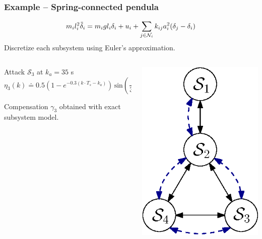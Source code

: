 \documentclass[presentation]{beamer}
\newcommand{\NN}{{\mathcal{N}}}
\begin{document}
\begin{frame}
	\frametitle{Example -- Spring-connected pendula}
	\begin{equation*}
		m_il_i^2\Ddot{\delta}_i = m_igl_i\delta_i + u_i + \sum_{j\in\NN_i} k_{ij}a_i^2(\delta_j-\delta_i)
	\end{equation*}
	\centering
	Discretize each subsystem using Euler's approximation.
	
	\vfill
	\begin{columns}
		\begin{column}{0.75\linewidth}
			Attack $\mathcal S_3 $ at $k_a = 35$ s
			$$\eta_3(k) \doteq 0.5 \left(1-e^{-0.3 (k\cdot T_s-k_a)}\right)\,\mathrm{sin}\left(\frac{2}{30} \pi k \cdot T_s\right)$$

			Compensation $\gamma_3$ obtained with exact subsystem model.
		\end{column}
		\begin{column}{0.23\linewidth}
			\includegraphics[scale=0.6]{fig/layout.eps}
		\end{column}
	\end{columns}
\end{frame}
\end{document}
